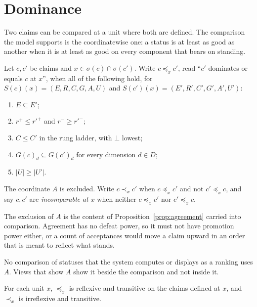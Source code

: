\section{Dominance}\label{sec:dominance}

Two claims can be compared at a unit where both are defined. The comparison the model supports is the coordinatewise one: a status is at least as good as another when it is at least as good on every component that bears on standing.

\begin{definition}[Dominance]\label{def:dominance}
Let $c,c'$ be claims and $x\in\sigma(c)\cap\sigma(c')$. Write $c\preceq_x c'$, read ``$c'$ dominates or equals $c$ at $x$'', when all of the following hold, for $S(c)(x)=(E,R,C,G,A,U)$ and $S(c')(x)=(E',R',C',G',A',U')$:
\begin{enumerate}[label=(\roman*)]
\item $E\subseteq E'$;
\item $r^+\le r'^+$ and $r^-\ge r'^-$;
\item $C\le C'$ in the rung ladder, with $\bot$ lowest;
\item $G(c)_d\subseteq G(c')_d$ for every dimension $d\in D$;
\item $|U|\ge|U'|$.
\end{enumerate}
The coordinate $A$ is excluded. Write $c\prec_x c'$ when $c\preceq_x c'$ and not $c'\preceq_x c$, and say $c,c'$ are \emph{incomparable at $x$} when neither $c\preceq_x c'$ nor $c'\preceq_x c$.
\end{definition}

The exclusion of $A$ is the content of Proposition~\ref{prop:agreement} carried into comparison. Agreement has no defeat power, so it must not have promotion power either, or a count of acceptances would move a claim upward in an order that is meant to reflect what stands.

\begin{designrule}\label{rule:noagree}
No comparison of statuses that the system computes or displays as a ranking uses $A$. Views that show $A$ show it beside the comparison and not inside it.
\end{designrule}

\begin{proposition}\label{prop:preorder}
For each unit $x$, $\preceq_x$ is reflexive and transitive on the claims defined at $x$, and $\prec_x$ is irreflexive and transitive.
\end{proposition}

